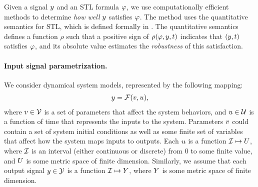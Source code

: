 Given a signal $y$ and an STL formula $\varphi$, we use computationally efficient methods to determine \emph{how well} $y$ satisfies $\varphi$.
The method uses the quantitative semantics for STL, which 
is defined formally in \cite{DonzeM10}. The
quantitative semantics defines a function $\rho$ such that a positive sign of
$\rho(\varphi,y,t)$ indicates that $(y,t)$ satisfies
$\varphi$, and its absolute value estimates the \emph{robustness} of
this satisfaction. %

\paragraph{Input signal parametrization.} We consider dynamical system models, represented by the following mapping:
\begin{eqnarray}
y = \mathcal{F} (v, u),
\end{eqnarray}
where $v \in \mathcal{V}$ is a set of parameters that affect the system behaviors, and $u \in \mathcal{U}$ is a function of time that represents the inputs to the system.
Parameters $v$ could contain a set of system initial conditions as well as some finite set of variables that affect how the system maps inputs to outputs.
Each $u$ is a function $\mathcal{I} \mapsto U$, where $\mathcal{I}$ is an interval (either continuous or discrete) from $0$ to some finite value, and $U$ is some metric space of finite dimension.
Similarly, we assume that each output signal $y \in \mathcal{Y}$ is a function $\mathcal{I} \mapsto Y$, where $Y$ is some metric space of finite dimension.

